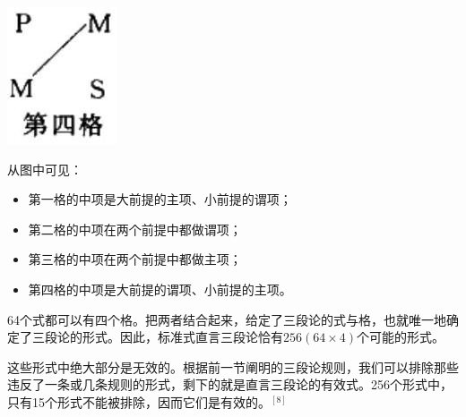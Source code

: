 \begin{center}
\includegraphics[width=\textwidth]{images/2025_05_15_6a28331d5e7c993ad07ag-288(1).jpg}
\end{center}

从图中可见：

\begin{itemize}
  \item 第一格的中项是大前提的主项、小前提的谓项；
  \item 第二格的中项在两个前提中都做谓项；
  \item 第三格的中项在两个前提中都做主项；
  \item 第四格的中项是大前提的谓项、小前提的主项。
\end{itemize}

64个式都可以有四个格。把两者结合起来，给定了三段论的式与格，也就唯一地确定了三段论的形式。因此，标准式直言三段论恰有$256(64 \times 4)$个可能的形式。

这些形式中绝大部分是无效的。根据前一节阐明的三段论规则，我们可以排除那些违反了一条或几条规则的形式，剩下的就是直言三段论的有效式。256个形式中，只有15个形式不能被排除，因而它们是有效的。$^{[8]}$

